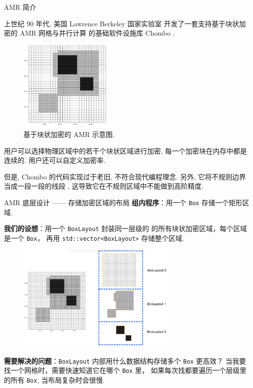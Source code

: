 \documentclass[10pt]{beamer}
\begin{document}
\begin{frame}[fragile]{AMR 简介}
    \footnotesize

    上世纪 90 年代, 美国 Lawrence Berkeley 国家实验室
    开发了一套支持基于块状加密的 AMR 网格与并行计算
    的基础软件设施库 Chombo\cite{ChomboDesign, ChomboAMR} . 

    \begin{figure}[H]
        \centering
        \includegraphics[width=0.4\textwidth]{png/blockAMR.png}
        \caption{\footnotesize 基于块状加密的 AMR 示意图.}
    \end{figure}

    用户可以选择物理区域中的若干个块状区域进行加密,
    每一个加密块在内存中都是连续的.
    用户还可以自定义加密率.

    \pause
    但是, Chombo 的代码实现过于老旧, 
    不符合现代编程理念.
    另外, 它将不规则边界当成一段一段的线段 \cite{ChomboEmbeddedBoundary},
    这导致它在不规则区域中不能做到高阶精度.
\end{frame}

\begin{frame}[fragile]{AMR 底层设计 —— 存储加密区域的布局}
    \footnotesize
    \textbf{组内程序}：用一个 \verb|Box| 存储一个矩形区域.

    \vspace{1em}
    \textbf{我们的设想}：用一个 \verb|BoxLayout| 封装同一层级的
    的所有块状加密区域，每个区域是一个 \verb|Box|，
    再用 \verb|std::vector<BoxLayout>| 存储整个区域.

    \begin{figure}[H]
        \centering
        \includegraphics[width=0.7\textwidth]{jpg/BoxLayout.jpeg}
    \end{figure}

    \textbf{需要解决的问题}：\verb|BoxLayout| 内部用什么数据结构存储多个 \verb|Box| 更高效？
    当我要找一个网格时，需要快速知道它在哪个 \verb|Box| 里，
    如果每次找都要遍历一个层级里的所有 \verb|Box|, 当布局复杂时会很慢.
\end{frame}
\end{document}
